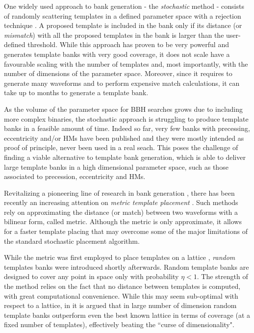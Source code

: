 \documentclass[twocolumn,showpacs,preprintnumbers,nofootinbib,prd,
superscriptaddress,10pt]{revtex4-2}
\begin{document}
One widely used approach to bank generation - the {\it stochastic} method \cite{Harry:2009ea, PhysRevD.80.104014, Ajith:2012mn} - consists of randomly scattering templates in a defined parameter space with a rejection technique \cite{DalCanton:2017ala, Mukherjee:2018yra, Indik:2016qky, Lenon:2021zac}. A proposed template is included in the bank only if its distance (or {\it mismatch}) with all the proposed templates in the bank is larger than the user-defined threshold.
While this approach has proven to be very powerful and generates template banks with very good coverage, it does not scale have a favourable scaling with the number of templates and, most importantly, with the number of dimensions of the parameter space.
Moreover, since it requires to generate many waveforms and to perform expensive match calculations, it can take up to months to generate a template bank.

As the volume of the parameter space for BBH searches grows due to including more complex binaries, the stochastic approach is struggling to produce template banks in a feasible amount of time.
Indeed so far, very few banks with precessing, eccentricity and/or HMs have been published \cite{Harry:2016ijz, Harry:2017weg} and they were  mostly intended as proof of principle, never been used in a real seach.
This poses the challenge of finding a viable alternative to template bank generation, which is able to deliver large template banks in a high dimensional parameter space, such as those associated to precession, eccentricity and HMs.

Revitalizing a pioneering line of research in bank generation \cite{owen_metric, Messenger:2008ta, Prix:2007ks, Brown:2012qf, Keppel:2013uma}, there has been recently an increasing attention on {\it metric template placement} \cite{Roy:2017oul, 2018cosp...42E2899R, Coogan:2022qxs, Hanna:2022zpk}.
Such methods rely on approximating the distance (or match) between two waveforms with a bilinear form, called metric.
Although the metric is only approximate, it allows for a faster template placing that may overcome some of the major limitations of the standard stochastic placement algorithm.

While the metric was first employed to place templates on a lattice \cite{owen_metric, Prix:2007ks}, {\it random} templates banks \cite{Messenger:2008ta} were introduced shortly afterwards.
Random template banks are designed to cover any point in space only with probability $\eta<1$.
The strength of the method relies on the fact that no distance between templates is computed, with great computational convenience.
While this may seem sub-optimal with respect to a lattice, in \cite{Messenger:2008ta, Allen:2022lqr, Allen:2021yuy} it is argued that in large number of dimension random template banks outperform even the best known lattice in terms of coverage (at a fixed number of templates), effectively beating the ``curse of dimensionality".
\end{document}
